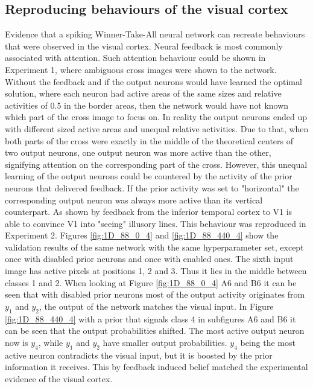 \subsection{Reproducing behaviours of the visual cortex}
Evidence that a spiking Winner-Take-All neural network can recreate behaviours that were observed in the visual cortex. Neural feedback is most commonly associated with attention. Such attention behaviour could be shown in Experiment 1, where ambiguous cross images were shown to the network. Without the feedback and if the output neurons would have learned the optimal solution, where each neuron had active areas of the same sizes and relative activities of 0.5 in the border areas, then the network would have not known which part of the cross image to focus on. In reality the output neurons ended up with different sized active areas and unequal relative activities. Due to that, when both parts of the cross were exactly in the middle of the theoretical centers of two output neurons, one output neuron was more active than the other, signifying attention on the corresponding part of the cross. However, this unequal learning of the output neurons could be countered by the activity of the prior neurons that delivered feedback. If the prior activity was set to "horizontal" the corresponding output neuron was always more active than its vertical counterpart. As shown by \citet{HierachicalBayesVisualCortex} feedback from the inferior temporal cortex to V1 is able to convince V1 into "seeing" illusory lines. This behaviour was reproduced in Experiment 2. Figures \ref{fig:1D_88_0_4} and \ref{fig:1D_88_440_4} show the validation results of the same network with the same hyperparameter set, except once with disabled prior neurons and once with enabled ones. The sixth input image has active pixels at positions 1, 2 and 3. Thus it lies in the middle between classes 1 and 2. When looking at Figure \ref{fig:1D_88_0_4} A6 and B6 it can be seen that with disabled prior neurons most of the output activity originates from $y_1$ and $y_2$, the output of the network  matches the visual input. In Figure \ref{fig:1D_88_440_4} with a prior that signals class 4 in subfigures A6 and B6 it can be seen that the output probabilities shifted. The most active output neuron now is $y_4$, while $y_1$ and $y_2$ have smaller output probabilities. $y_4$ being the most active neuron contradicts the visual input, but it is boosted by the prior information it receives. This by feedback induced belief matched the experimental evidence of the visual cortex.

